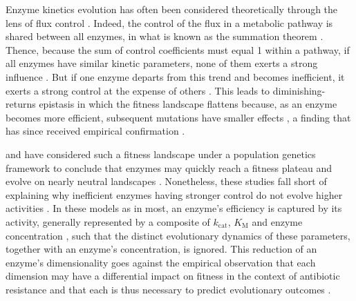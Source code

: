 


Enzyme kinetics evolution has often been considered theoretically through the lens of flux control \citep{Burns85,Clark91,Fell92,Kacser95,Yi19}. Indeed, the control of the flux in a metabolic pathway is shared between all enzymes, in what is known as the summation theorem \citep {Kacser73,Heinrich74}. Thence, because the sum of control coefficients must equal 1 within a pathway, if all enzymes have similar kinetic parameters, none of them exerts a strong influence \citep{Dean95}. But if one enzyme departs from this trend and becomes inefficient, it exerts a strong control at the expense of others \citep{Dykhuizen90}. This leads to diminishing-returns epistasis in which the fitness landscape flattens because, as an enzyme becomes more efficient, subsequent mutations have smaller effects \citep{Kacser73,Dykhuizen87,Tokuriki12}, a finding that has since received empirical confirmation \citep{Fell92,Dean95,Lunzer05,Yi19,Chou14}.

 \citet{Hartl85} and \citet{Dean86} have considered such a fitness landscape under a population genetics framework to conclude that enzymes may quickly reach a fitness plateau and evolve on nearly neutral landscapes \citep{Ohta92}. Nonetheless, these studies fall short of explaining why inefficient enzymes having stronger control do not evolve higher activities \citep{Yi19}. In these models as in most, an enzyme's efficiency is captured by its activity, generally represented by a composite of $k_\text{cat}$, $K_\text{M}$ and enzyme concentration \citep{Hartl85,Clark91,Chou14,Kaltenbach14}, such that the distinct evolutionary dynamics of these parameters, together with an enzyme's concentration, is ignored. This reduction of an enzyme's dimensionality goes against the empirical observation that each dimension may have a differential impact on fitness in the context of antibiotic resistance \citep{Walkiewicz12,Stiffler15,Rodrigues16} and that each is thus necessary to predict evolutionary outcomes \citep{Walkiewicz12}.\\


